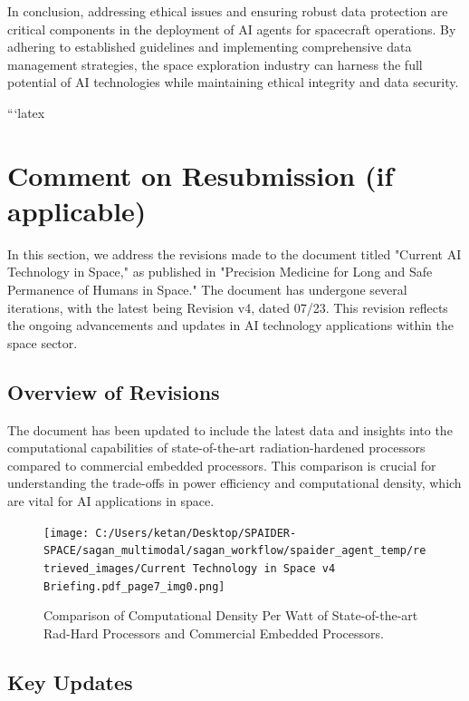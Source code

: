 \documentclass[a4paper, 11pt]{article}
\begin{document}
In conclusion, addressing ethical issues and ensuring robust data protection are critical components in the deployment of AI agents for spacecraft operations. By adhering to established guidelines and implementing comprehensive data management strategies, the space exploration industry can harness the full potential of AI technologies while maintaining ethical integrity and data security.




```latex
\section{Comment on Resubmission (if applicable)}

In this section, we address the revisions made to the document titled "Current AI Technology in Space," as published in "Precision Medicine for Long and Safe Permanence of Humans in Space." The document has undergone several iterations, with the latest being Revision v4, dated 07/23. This revision reflects the ongoing advancements and updates in AI technology applications within the space sector.

\subsection{Overview of Revisions}

The document has been updated to include the latest data and insights into the computational capabilities of state-of-the-art radiation-hardened processors compared to commercial embedded processors. This comparison is crucial for understanding the trade-offs in power efficiency and computational density, which are vital for AI applications in space.

\begin{figure}[htbp]
    \centering
    \texttt{[image: C:/Users/ketan/Desktop/SPAIDER-SPACE/sagan\_multimodal/sagan\_workflow/spaider\_agent\_temp/retrieved\_images/Current Technology in Space v4 Briefing.pdf\_page7\_img0.png]}
    \caption{Comparison of Computational Density Per Watt of State-of-the-art Rad-Hard Processors and Commercial Embedded Processors.}
    \label{fig:comp-density}
\end{figure}

\subsection{Key Updates}
\end{document}
